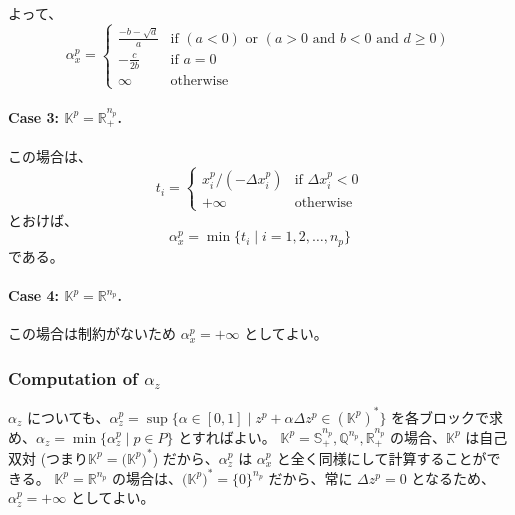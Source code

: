 \documentclass{jsarticle}
\begin{document}
よって、
\begin{equation*}
    \alpha^p_x=\begin{cases}
       \frac{-b - \sqrt{d}}{a} & \text{if } (a < 0) \text{ or } (a > 0 \text{ and } b < 0 \text{ and } d \geq 0)\\
       -\frac{c}{2b} & \text{if $a=0$} \\
       \infty & \text{otherwise}
    \end{cases}
\end{equation*}

\paragraph{Case 3: $\mathbb{K}^p = \mathbb{R}^{n_p}_+$.}
この場合は、
\[
t_i= \begin{cases}
    x^p_i / (-\Delta x^p_i) & \text{if } \Delta x^p_i < 0 \\
    +\infty & \text{otherwise}
\end{cases}
\]
とおけば、
\[
    \alpha^p_x = \min\{t_i \mid i=1,2,\ldots,n_p\}
\]
である。

\paragraph{Case 4: $\mathbb{K}^p = \mathbb{R}^{n_p}$.}
この場合は制約がないため $\alpha^p_x=+\infty$ としてよい。

\medskip

\subsubsection{Computation of $\alpha_z$}
$\alpha_z$ についても、$\alpha^p_z = \sup\{\alpha\in [0, 1] \mid z^p + \alpha\Delta z^p \in (\mathbb{K}^p)^*\}$ を各ブロックで求め、$\alpha_z=\min\{\alpha^p_z \mid p \in P\}$ とすればよい。
$\mathbb{K}^p=\mathbb{S}^{n_p}_+,\mathbb{Q}^{n_p},\mathbb{R}^{n_p}_+$ の場合、$\mathbb{K}^p$ は自己双対 (つまり$\mathbb{K}^p = \bigl(\mathbb{K}^p\bigr)^*$) だから、$\alpha^p_z$ は $\alpha^p_x$ と全く同様にして計算することができる。
$\mathbb{K}^p=\mathbb{R}^{n_p}$ の場合は、$\bigl(\mathbb{K}^p\bigr)^*=\{0\}^{n_p}$ だから、常に $\Delta z^p = 0$ となるため、$\alpha^p_z=+\infty$ としてよい。
\end{document}
